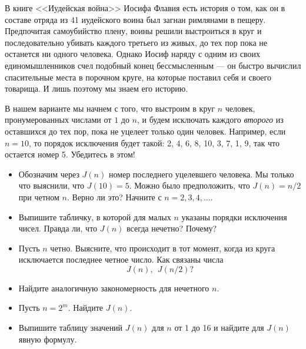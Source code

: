 ﻿

В книге <<Иудейская война>> Иосифа Флавия есть история о том, как он в составе отряда из 41 иудейского воина был загнан римлянами в пещеру. Предпочитая самоубийство плену, воины решили выстроиться в круг и последовательно убивать каждого третьего из живых, до тех пор пока не останется ни одного человека. Однако Иосиф наряду с одним из своих единомышленников счел подобный конец бессмысленным --- он быстро вычислил спасительные места в порочном круге, на которые поставил себя и своего товарища. И лишь поэтому мы знаем его историю.

В нашем варианте мы начнем с того, что выстроим в круг $n$ человек, пронумерованных числами от $1$ до $n$, и будем исключать каждого {\itshape второго} из оставшихся до тех пор, пока не уцелеет только один человек. Например, если $n = 10$, то порядок исключения будет такой: 2, 4, 6, 8, 10, 3, 7, 1, 9, так что остается номер 5. Убедитесь в этом!
\begin{itemize}
\item Обозначим через $J(n)$ номер последнего уцелевшего человека. Мы только что выяснили, что $J(10) = 5$. Можно было предположить, что $J(n) = n/2$ при четном $n$. Верно ли это? Начните с $n = 2,3,4,\ldots$.
\item Выпишите табличку, в которой для малых $n$ указаны порядки исключения чисел. Правда ли, что $J(n)$ всегда нечетно? Почему?
\item Пусть $n$ четно. Выясните, что происходит в тот момент, когда из круга исключается последнее четное число. Как связаны числа
$$J(n), \ \ J(n/2)\text{?}$$
\item Найдите аналогичную закономерность для нечетного $n$.
\item Пусть $n = 2^m$. Найдите $J(n)$.
\item Выпишите таблицу значений $J(n)$ для $n$ от 1 до 16 и найдите для $J(n)$ явную формулу.
\end{itemize}